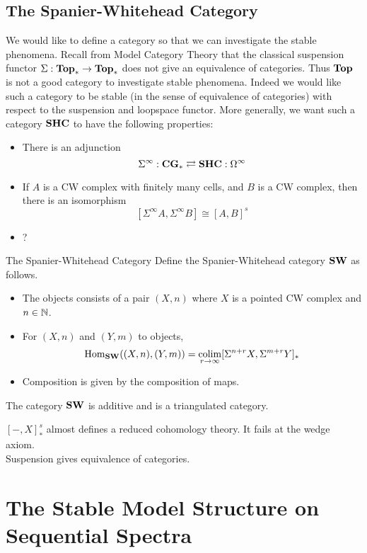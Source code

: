 \documentclass[a4paper]{article}
\begin{document}
\subsection{The Spanier-Whitehead Category}
We would like to define a category so that we can investigate the stable phenomena. Recall from Model Category Theory that the classical suspension functor $\Sigma:\bold{Top}_\ast\to\bold{Top}_\ast$ does not give an equivalence of categories. Thus $\bold{Top}$ is not a good category to investigate stable phenomena. Indeed we would like such a category to be stable (in the sense of equivalence of categories) with respect to the suspension and loopspace functor. More generally, we want such a category $\bold{SHC}$ to have the following properties: 
\begin{itemize}
\item There is an adjunction $$\Sigma^\infty:\bold{CG}_\ast\rightleftarrows\bold{SHC}:\Omega^\infty$$
\item If $A$ is a CW complex with finitely many cells, and $B$ is a CW complex, then there is an isomorphism $$[\Sigma^\infty A,\Sigma^\infty B]\cong[A,B]^s$$
\item ?
\end{itemize}

\begin{defn}{The Spanier-Whitehead Category}{} Define the Spanier-Whitehead category $\bold{SW}$ as follows. 
\begin{itemize}
\item The objects consists of a pair $(X,n)$ where $X$ is a pointed CW complex and $n\in\mathbb{N}$. 
\item For $(X,n)$ and $(Y,m)$ to objects, $$\operatorname{Hom}_{\bold{SW}}((X,n),(Y,m))=\operatorname*{colim}_{r\to\infty}[\Sigma^{n+r}X,\Sigma^{m+r}Y]_\ast$$
\item Composition is given by the composition of maps. 
\end{itemize}
\end{defn}

\begin{prp}{}{} The category $\bold{SW}$ is additive and is a triangulated category. 
\end{prp}

$[-,X]_\ast^s$ almost defines a reduced cohomology theory. It fails at the wedge axiom. \\
Suspension gives equivalence of categories. 

\pagebreak
\section{The Stable Model Structure on Sequential Spectra}
\end{document}
